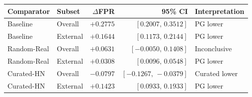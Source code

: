 \begin{tabular}{@{}llrrl@{}}
\toprule
Comparator & Subset & $\Delta$FPR & 95\% CI & Interpretation \\
\midrule
Baseline & Overall & $+0.2775$ & $[0.2007,\,0.3512]$ & PG lower \\
Baseline & External & $+0.1644$ & $[0.1173,\,0.2144]$ & PG lower \\
Random-Real & Overall & $+0.0631$ & $[-0.0050,\,0.1408]$ & Inconclusive \\
Random-Real & External & $+0.0308$ & $[0.0096,\,0.0548]$ & PG lower \\
Curated-HN & Overall & $-0.0797$ & $[-0.1267,\,-0.0379]$ & Curated lower \\
Curated-HN & External & $+0.1423$ & $[0.0933,\,0.1933]$ & PG lower \\
\bottomrule
\end{tabular}
